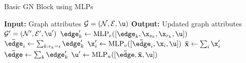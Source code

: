 \begin{algorithm}
    \caption{Basic GN Block using MLPs}
    \label{alg:gn_block}
    \begin{algorithmic}[1]
        \State \textbf{Input:} Graph attributes $\mathcal{G} = (\mathcal{N}, \mathcal{E}, \u)$
        \State \textbf{Output:} Updated graph attributes $\mathcal{G}' = (\mathcal{N}', \mathcal{E}', \u')$
            \State $\edge_k' \gets \text{MLP}_e([\edge_k, \x_{s_k}, \x_{r_k}, \u])$ 
        \EndFor
            \State $\mathbf{\bar\edge}_i \gets \sum_{k: r_k = i} \edge_k'$ 
            \State $\x_i' \gets \text{MLP}_v([\mathbf{\bar\edge}_i, \x_i, \u])$ 
        \EndFor
        \State $\mathbf{\bar{x}} \gets \sum_{i} \x_i'$ 
        \State $\mathbf{\bar\edge} \gets \sum_{k} \edge_k'$
        \State $\u' \gets \text{MLP}_u([\mathbf{\bar\edge}, \mathbf{\bar{x}}, \u])$ 
    \end{algorithmic}
\end{algorithm}

